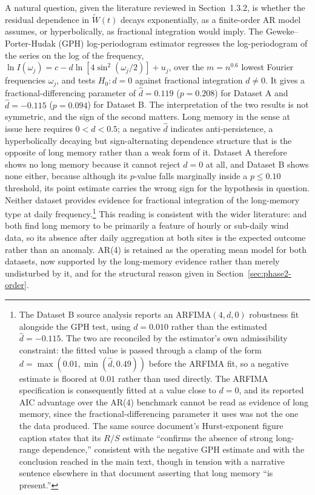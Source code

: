 \documentclass[11pt, a4paper, twoside]{article}
\begin{document}
A natural question, given the literature reviewed in Section~1.3.2, is whether the residual dependence in $\widetilde W(t)$ decays exponentially, as a finite-order AR model assumes, or hyperbolically, as fractional integration would imply. The Geweke--Porter-Hudak (GPH) log-periodogram estimator regresses the log-periodogram of the series on the log of the frequency, $\ln I(\omega_j) = c - d\ln\left[4\sin^2(\omega_j/2)\right] + u_j$, over the $m = n^{0.6}$ lowest Fourier frequencies $\omega_j$, and tests $H_0: d = 0$ against fractional integration $d \neq 0$. It gives a fractional-differencing parameter of $\hat d = 0.119$ ($p = 0.208$) for Dataset A and $\hat d = -0.115$ ($p = 0.094$) for Dataset B. The interpretation of the two results is not symmetric, and the sign of the second matters. Long memory in the sense at issue here requires $0 < d < 0.5$; a negative $\hat d$ indicates anti-persistence, a hyperbolically decaying but sign-alternating dependence structure that is the opposite of long memory rather than a weak form of it. Dataset A therefore shows no long memory because it cannot reject $d = 0$ at all, and Dataset B shows none either, because although its $p$-value falls marginally inside a $p \le 0.10$ threshold, its point estimate carries the wrong sign for the hypothesis in question. Neither dataset provides evidence for fractional integration of the long-memory type at daily frequency.\footnote{The Dataset B source analysis reports an ARFIMA$(4,d,0)$ robustness fit alongside the GPH test, using $d = 0.010$ rather than the estimated $\hat d = -0.115$. The two are reconciled by the estimator's own admissibility constraint: the fitted value is passed through a clamp of the form $d = \max(0.01, \min(\hat d, 0.49))$ before the ARFIMA fit, so a negative estimate is floored at $0.01$ rather than used directly. The ARFIMA specification is consequently fitted at a value close to $d = 0$, and its reported AIC advantage over the AR(4) benchmark cannot be read as evidence of long memory, since the fractional-differencing parameter it uses was not the one the data produced. The same source document's Hurst-exponent figure caption states that its $R/S$ estimate ``confirms the absence of strong long-range dependence,'' consistent with the negative GPH estimate and with the conclusion reached in the main text, though in tension with a narrative sentence elsewhere in that document asserting that long memory ``is present.''} This reading is consistent with the wider literature: \citet{HaslettRaftery1989} and \citet{KavasseriSeetharaman2009} both find long memory to be primarily a feature of hourly or sub-daily wind data, so its absence after daily aggregation at both sites is the expected outcome rather than an anomaly. AR(4) is retained as the operating mean model for both datasets, now supported by the long-memory evidence rather than merely undisturbed by it, and for the structural reason given in Section~\ref{sec:phase2-order}.
\end{document}
